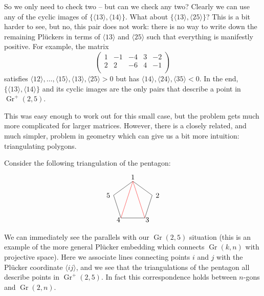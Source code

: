 \documentclass[11pt]{article}
\DeclareMathOperator{\Gr}{Gr}
\def\ket#1{\langle #1 \rangle}
\def\drawLabeledPentagon{
\coordinate (P1) at (90:1);
\coordinate (P2) at (18:1);
\coordinate (P3) at (306:1);
\coordinate (P4) at (234:1);
\coordinate (P5) at (162:1);
\draw (P1) -- (P2) -- (P3) -- (P4) -- (P5) -- cycle;
\draw (0,1.2) node {1};
\draw (1,.3) node[anchor=west] {2};
\draw (.5,-.9) node[anchor=west] {3};
\draw (-.5,-.9) node[anchor=east] {4};
\draw (-1,.3) node[anchor=east] {5};
}
\begin{document}
So we only need to check two -- but can we check any two? Clearly we can use any of the cyclic images of $\{\ket{13}, \ket{14}\}$. What about $\{\ket{13}, \ket{25}\}$? This is a bit harder to see, but no, this pair does not work: there is no way to write down the remaining Pl\"uckers in terms of $\ket{13}$ and $\ket{25}$ such that everything is manifestly positive. For example, the matrix
\begin{equation}
\left(
\begin{array}{ccccc}
 1 & -1 & -4 & 3 & -2 \\
 2 & 2 & -6 & 4 & -1 \\
\end{array}
\right)
\end{equation}
satisfies $\ket{12},\ldots,\ket{15},\ket{13},\ket{25}>0$ but has $\ket{14},\ket{24},\ket{35}<0$. In the end, $\{\ket{13}, \ket{14}\}$ and its cyclic images are the only pairs that describe a point in $\Gr^+(2,5)$. 

This was easy enough to work out for this small case, but the problem gets much more complicated for larger matrices. However, there is a closely related, and much simpler, problem in geometry which can give us a bit more intuition: triangulating polygons.

Consider the following triangulation of the pentagon:
\begin{equation}
\begin{tikzpicture}
  \drawLabeledPentagon
  \draw[color=red] (P1) -- (P3);
  \draw[color=red] (P1) -- (P4);
\end{tikzpicture}
\end{equation}
We can immediately see the parallels with our $\Gr(2,5)$ situation (this is an example of the more general Pl\"ucker embedding which connects $\Gr(k,n)$ with projective space). Here we associate lines connecting points $i$ and $j$ with the Pl\"ucker coordinate $\ket{ij}$, and we see that the triangulations of the pentagon all describe points in $\Gr^+(2,5)$. In fact this correspondence holds between $n$-gons and $\Gr(2,n)$. 
\end{document}
